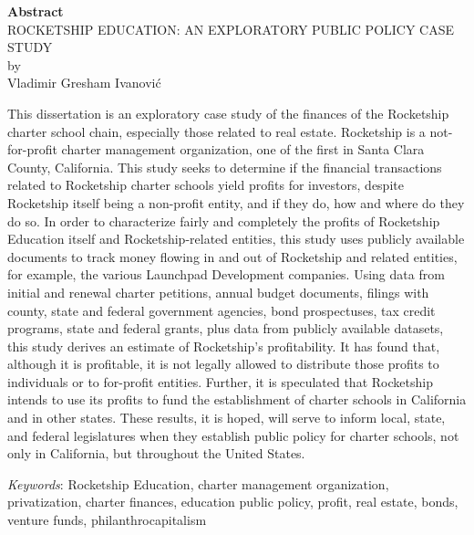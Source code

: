 
\begin{center}
  \textbf{Abstract}\\
  ROCKETSHIP EDUCATION: AN EXPLORATORY PUBLIC POLICY CASE STUDY\\
  by\\
  Vladimir Gresham Ivanović\\
\end{center}
This dissertation is an exploratory case study of the finances of the Rocketship charter school chain, especially those related to real estate. Rocketship is a  not-for-profit charter management organization, one of the first in Santa Clara County, California. This study seeks to determine if the financial transactions related to Rocketship charter schools yield profits for investors, despite Rocketship itself being a non-profit entity, and if they do, how and where do they do so. In order to characterize fairly and completely the profits of Rocketship Education itself and Rocketship-related entities, this study uses publicly available documents to track money flowing in and out of Rocketship and related entities, for example, the various Launchpad Development companies. Using data from initial and renewal charter petitions, annual budget documents, filings with county, state and federal government agencies, bond prospectuses, tax credit programs, state and federal grants, plus data from publicly available datasets, this study derives an estimate of Rocketship's profitability. It has found that, although it is profitable, it is not legally allowed to distribute those profits to individuals or to for-profit entities.  Further, it is speculated that Rocketship intends to use its profits to fund the establishment of charter schools in California and in other states. These results, it is hoped, will serve to inform local, state, and federal legislatures when they establish public policy for charter schools, not only in California, but throughout the United States.\bigskip

\noindent\textit{Keywords}: Rocketship Education, charter management organization, privatization, charter finances, education public policy, profit, real estate, bonds, venture funds, philanthrocapitalism

